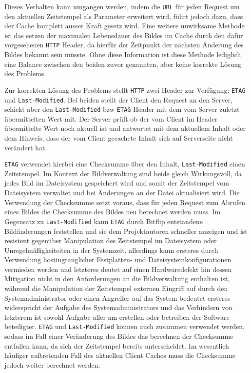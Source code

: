 Dieses Verhalten kann umgangen werden, indem die \texttt{URL} für jeden Request
um den aktuellen Zeitstempel als Parameter erweitert wird, führt jedoch dazu,
dass der Cache komplett ausser Kraft gesetz wird. Eine weitere unwirksame
Methode ist das setzen der maximalen Lebensdauer des Bildes im Cache durch den
dafür vorgesehenen \texttt{HTTP} Header, da hierfür der Zeitpunkt der nächsten
Änderung des Bildes bekannt sein müsste. Ohne diese Information ist diese
Methode lediglich eine Balance zwischen den beiden zuvor genannten, aber keine
korrekte Lösung des Problems.

Zur korrekten Lösung des Problems stellt \texttt{HTTP} zwei Header zur
Verfügung: \texttt{ETAG} und \texttt{Last-Modified}. Bei beiden stellt der
Client den Request an den Server, schickt aber den \texttt{Last-Modified} bzw
\texttt{ETAG} Header mit dem vom Server zuletzt übermittelten Wert mit. Der
Server prüft ob der vom Client im Header übermittelte Wert noch aktuell ist und
antwortet mit dem aktuellem Inhalt oder dem Hinweis, dass der vom Client
gecachete Inhalt sich auf Serverseite nicht verändert hat.

\texttt{ETAG} verwendet hierbei eine Checksumme über den Inhalt,
\texttt{Last-Modified} einen Zeitstempel. Im Kontext der Bildverwaltung sind
beide gleich Wirkungsvoll, da jedes Bild im Dateisystem gespeichert wird und
somit der Zeitstempel vom Dateisystem verwaltet und bei Änderungen an der Datei
aktualisiert wird. Die Verwendung der Checksumme setzt voraus, dass für jeden
Request zum Abrufen eines Bildes die Checksumme des Bildes neu berechnet werden
muss. Im Gegensatz zu \texttt{Last-Modified} kann \texttt{ETAG} durch Bitflip
entstandene Bildänderungen feststellen und sie dem Projektautoren schneller
anzeigen und ist resistent gegenüber Manipulation des Zeitstempel im Dateisystem
oder Unregelmäßigkeiteiten in der Systemzeit, allerdings kann ersteres durch
Verwendung hostingtauglicher Festplatten- und Dateisystemkonfigurationen
vermieden werden und letzteres deutet auf einen Hardwaredefekt hin dessen
Mitigation nicht in den Anforderungen an die Bildverwaltung enthalten ist,
während die Manipulation der Zeitstempel externen Eingriff auf durch den
Systemadministrator oder einen Angreifer auf das System bedeutet ersteres
widerspricht der Aufgabe des Systemadministrators und das Verhindern von
letzterem ist sowohl Aufgabe aller am erstellen oder betreiben der Software
beteiligter. \texttt{ETAG} und \texttt{Last-Modified} können auch zusammen
verwendet werden, sodass im Fall einer Veränderung des Bildes das berechnen der
Checksumme entfallen kann, da sich der Zeitstempel bereits unterscheidet. Im
wesentlich häufiger auftretenden Fall des aktuellen Client Caches muss die
Checksumme jedoch weiter berechnet werden.

